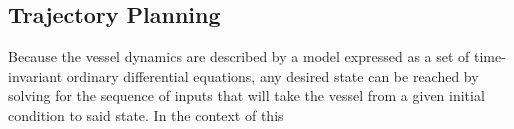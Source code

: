 \subsection{Trajectory Planning}
Because the vessel dynamics are described by a model expressed as a set of time-invariant ordinary differential equations, any desired state
can be reached by solving for the sequence of inputs that will take the vessel from a given initial condition to said state. In the context of this
